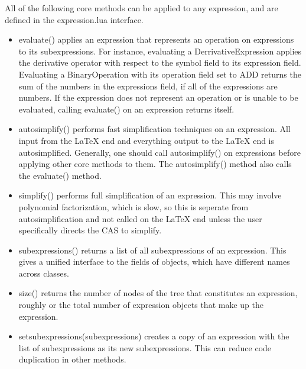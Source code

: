 \documentclass{article}
\begin{document}
All of the following core methods can be applied to any expression, and are defined in the {\ttfamily expression.lua} interface.

\begin{itemize}
    \item {\ttfamily evaluate()} applies an expression that represents an operation on expressions to its subexpressions. For instance, evaluating a {\ttfamily DerrivativeExpression} applies the derivative operator with respect to the {\ttfamily symbol} field to its {\ttfamily expression} field. Evaluating a {\ttfamily BinaryOperation} with its {\ttfamily operation} field set to {\ttfamily ADD} returns the sum of the numbers in the {\ttfamily expressions} field, if all of the expressions are numbers. If the expression does not represent an operation or is unable to be evaluated, calling {\ttfamily evaluate()} on an expression returns itself.
    
    \item {\ttfamily autosimplify()} performs fast simplification techniques on an expression. All input from the \LaTeX{} end and everything output to the \LaTeX{} end is autosimplified. Generally, one should call {\ttfamily autosimplify()} on expressions before applying other core methods to them. The {\ttfamily autosimplify()} method also calls the {\ttfamily evaluate()} method.
    
    \item {\ttfamily simplify()} performs full simplification of an expression. This may involve polynomial factorization, which is slow, so this is seperate from autosimplification and not called on the \LaTeX{} end unless the user specifically directs the CAS to simplify.
    
    \item {\ttfamily subexpressions()} returns a list of all subexpressions of an expression. This gives a unified interface to the fields of objects, which have different names across classes.
    
    \item {\ttfamily size()} returns the number of nodes of the tree that constitutes an expression, roughly or the total number of expression objects that make up the expression.
    
    \item {\ttfamily setsubexpressions(subexpressions)} creates a copy of an expression with the list of subexpressions as its new subexpressions. This can reduce code duplication in other methods.
    

\end{itemize}
\end{document}
